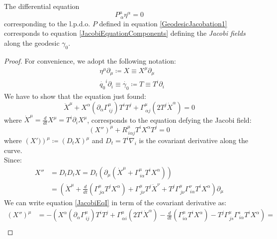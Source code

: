\documentclass[Main]{subfiles}
\begin{document}
	
	\begin{proposition}
		The differential equation $$P^\mu_{\: \alpha} \eta^\alpha=0$$ corresponding to the l.p.d.o. $P$ defined in equation \ref{GeodesicJacobation1} corresponds to equation \ref{JacobiEquationComponents} defining  the \emph{Jacobi fields} along the geodesic $\gamma_0$.
	\end{proposition}
	\begin{proof}
		For convenience, we adopt the following notation:
		\begin{align*}
		&\eta^\mu \partial_\mu \coloneqq X \equiv X^\mu \partial_\mu \\
		&\dot{q_0}^i \partial_i \equiv \dot{\gamma_0} \coloneqq T \equiv T^i \partial_i
		\end{align*}
		We have to show that the equation just found:
		\begin{equation}\label{JacobiEqI}
			\ddot{X}^\mu + X^\alpha\left(\partial_\alpha\Gamma^{\mu}_{\, i j}\right)T^i T^j + \Gamma^\mu_{\, \alpha j}\left(2 T^j \dot{X}^\alpha \right) = 0
		\end{equation}
		where $\dot{X}^\mu = \frac{d}{dt}X^\mu= T^i \partial_i X^\mu$,
		corresponds to the equation defying the Jacobi field:
		\begin{equation}\label{JacobiEqII}
			\left(X'' \right)^\mu + R^\mu_{\, i \alpha j}T^i X^\alpha T^j = 0
		\end{equation}
		where $\left(X')\right)^\mu \coloneqq \left(D_t X \right)^\mu$ and $D_t = T^i \nabla_i$ is the covariant derivative along the curve.\\
		Since:
		\begin{align}\label{JacobiEqDerivative}
			X'' &= D_t D_t X = D_t \left( \partial_\mu \left( \dot{X}^\mu + \Gamma^\mu_{\, i \alpha} T^i X^\alpha \right)\right) \nonumber \\
			&=\left( \ddot{X}^\mu + \frac{d}{dt}\left( \Gamma^\mu_{\, j \alpha} T^j X^\alpha \right) + \Gamma^\mu_{\, j \nu}T^j \dot{X}^\nu + T^j \Gamma^\mu_{\, j \nu} \Gamma^\nu_{\, i \alpha} T^i X^\alpha \right)\partial_\mu
		\end{align}
		We can write equation \ref{JacobiEqI} in term of the covariant derivative as:
		\begin{align*}
			\left(X'' \right)^\mu &=
			- \left(
			X^\alpha\left(\partial_\alpha\Gamma^{\mu}_{\, i j}\right)T^i T^j + \Gamma^\mu_{\, \alpha i}\left(2 T^i \dot{X}^\alpha \right)
			- \frac{d}{dt}\left( \Gamma^\mu_{i \alpha} T^i X^\alpha \right) - T^j \Gamma^\mu_{\, j s} \Gamma^s_{\, i \alpha} T^i X^\alpha
			\right) =\\

\end{align*}
\end{proof}
\end{document}
